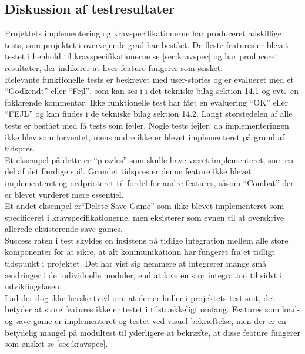 \subsection{Diskussion af testresultater}
Projektets implementering og kravspecifikationerne har produceret adskillige tests, som 
projektet i overvejende grad har bestået. De fleste features er blevet
testet i henhold til kravspecifikationerne se \autoref{sec:kravspec} og har produceret 
resultater, der indikerer at hver feature fungerer som ønsket. \\

\noindent Relevante funktionelle tests er beskrevet med user-stories og er evalueret med et ``Godkendt''
eller ``Fejl'', som kan ses i i det tekniske bilag sektion 14.1 og evt.\ en foklarende kommentar. 
Ikke funktionelle 
test har fået en evaluering ``OK'' eller ``FEJL'' og kan findes i de tekniske bilag sektion 14.2.
Langt størstedelen af alle tests er bestået med få tests som fejler. 
Nogle tests fejler, da implementeringen ikke blev som forventet, mens andre ikke er blevet 
implementeret på grund af tidspres. \\

\noindent Et eksempel på dette er ``puzzles'' som skulle have været implementeret, som en del af det færdige spil.
Grundet tidspres er denne feature ikke blevet implementeret og
nedprioteret til fordel for andre features, såsom ``Combat'' der er blevet vurderet mere essentiel.\\

\noindent Et andet eksempel er``Delete Save Game'' som ikke blevet implementeret som specificeret i kravspecifikationerne, men
eksisterer som evnen til at overskrive allerede eksisterende save games.\\
Success raten i test skyldes en insistens på tidlige integration mellem alle store komponenter for at sikre, at 
alt kommunikationn har fungeret fra et tidligt 
tidspunkt i projektet. Det har vist sig nemmere at integrerer mange små ændringer i de individuelle moduler, end at lave en stor integration til sidst i udviklingsfasen.\\

\noindent Lad der dog ikke herske tvivl om, at der er huller i projektets test suit, det
betyder at store features ikke er testet i tilstrækkeligt omfang. Features som load- og save game er implementeret og testet ved visuel bekræftelse, men der er en betydelig mangel på modultest til yderligere at bekræfte, at disse feature fungerer som ønsket se \autoref{sec:kravspec}. \\

\newpage